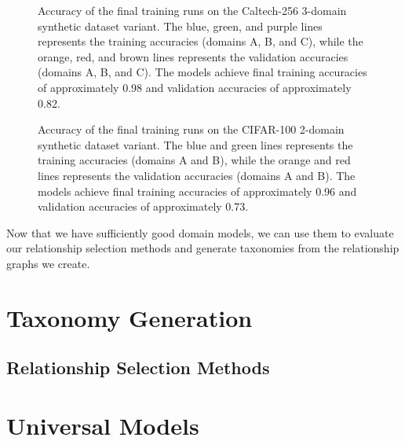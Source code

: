 \begin{figure}[ht]
      \centering
      \scalebox{0.6}{}
      \caption{Accuracy of the final training runs on the Caltech-256 3-domain synthetic dataset variant.
            The blue, green, and purple lines represents the training accuracies (domains A, B, and C),
            while the orange, red, and brown lines represents the validation accuracies (domains A, B, and C).
            The models achieve final training accuracies of approximately 0.98 and validation accuracies of approximately 0.82.}
      \label{fig:caltech256_3domain_accuracy}
\end{figure}

\begin{figure}[ht]
      \centering
      \scalebox{0.6}{}
      \caption{Accuracy of the final training runs on the CIFAR-100 2-domain synthetic dataset variant.
            The blue and green lines represents the training accuracies (domains A and B),
            while the orange and red lines represents the validation accuracies (domains A and B).
            The models achieve final training accuracies of approximately 0.96 and validation accuracies of approximately 0.73.}
      \label{fig:cifar100_2domain_accuracy}
\end{figure}



Now that we have sufficiently good domain models,
we can use them to evaluate our relationship selection methods
and generate taxonomies from the relationship graphs we create.


\section{Taxonomy Generation}

\subsection{Relationship Selection Methods} \label{sec:relationship_selection}



\section{Universal Models}

